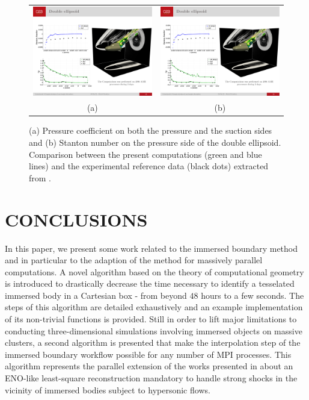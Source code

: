 \begin{figure}[ht!]
    \centering
    \begin{tabular}{cc}
        \includegraphics[width=0.45\linewidth]{chapter3_numerical_methods/pictures/ellipse_cp.pdf} &
        \includegraphics[width=0.45\linewidth]{chapter3_numerical_methods/pictures/ellipse_stanton.pdf} \\
        (a) & (b)
    \end{tabular}
    \caption{(a) Pressure coefficient on both the pressure and the suction sides and (b) Stanton number on the pressure side of the double ellipsoid.
    Comparison between the present computations (green and blue lines) and the experimental reference data (black dots) extracted from \cite{Aymer1991}.}
    \label{fig:ellipse_comp}
\end{figure}


\section{CONCLUSIONS}

In this paper, we present some work related to the immersed boundary method and in particular to the adaption of the method for massively parallel computations.
A novel algorithm based on the theory of computational geometry is introduced to drastically decrease the time necessary to identify a tesselated immersed body in a Cartesian box - from beyond $48$ hours to a few seconds.
The steps of this algorithm are detailed exhaustively and an example implementation of its non-trivial functions is provided.
Still in order to lift major limitations to conducting three-dimensional simulations involving immersed objects on massive clusters, a second algorithm is presented that make the interpolation step of the immersed boundary workflow possible for any number of MPI processes.
This algorithm represents the parallel extension of the works presented in \cite{BRIDELBERTOMEU2021} about an ENO-like least-square reconstruction mandatory to handle strong shocks in the vicinity of immersed bodies subject to hypersonic flows.

